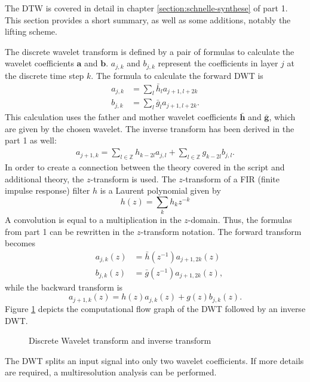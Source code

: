 \begin{refsection}
The DTW is covered in detail in chapter \ref{section:schnelle-synthese} of part 1.
This section provides a short summary, as well as some additions, notably the lifting scheme.

The discrete wavelet transform is defined by a pair of formulas to calculate the wavelet coefficients $\bm a$ and $\bm b$.
$a_{j,k}$ and $b_{j,k}$ represent the coefficients in layer $j$ at the discrete time step $k$.
The formula to calculate the forward DWT is
\begin{align}
a_{j,k} &= \sum_{l} \bar{h}_l a_{j+1,l+2k}
\\
b_{j,k} &= \sum_{l} \bar{g}_l a_{j+1,l+2k} .
\end{align}
This calculation uses the father and mother wavelet coefficients $\bm{\bar h}$ and $\bm{\bar g}$, which are given by the chosen wavelet.
The inverse transform has been derived in the part 1 as well: 
\begin{align}
a_{j+1,k} =
\sum_{l\in\mathbb Z}
h_{k-2l}
a_{j,l}
+
\sum_{l\in\mathbb Z}
g_{k-2l}
b_{j,l} .
\end{align}
In order to create a connection between the theory covered in the script and additional theory, the $z$-transform is used.
The $z$-transform of a FIR (finite impulse response) filter $h$ is a Laurent polynomial given by
%
%
%
\begin{equation}
h(z) = \sum_{k} h_k z^{-k}
\end{equation}
A convolution is equal to a multiplication in the $z$-domain.
Thus, the formulas from part 1 can be rewritten in the $z$-transform notation.
The forward transform becomes
\begin{align}
\quad a_{j,k}(z) &= \bar h(z^{-1}) a_{j+1,2k}(z) 
\\
\quad b_{j,k}(z) &= \bar g(z^{-1}) a_{j+1,2k}(z),
\end{align}
while the backward transform is
\begin{equation}
a_{j+1,k}(z) = h(z) a_{j,k}(z) + g(z) b_{j,k}(z).
\end{equation}
Figure \ref{fpga:fig:dwt} depicts the computational flow graph of the DWT followed by an inverse DWT.
\begin{figure}
	\centering
	
	\caption{Discrete Wavelet transform and inverse transform}
	\label{fpga:fig:dwt}
\end{figure}
The DWT splits an input signal into only two wavelet coefficients.
If more details are required, a multiresolution analysis can be performed.

\end{refsection}

